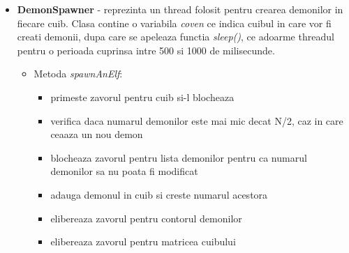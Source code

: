 \documentclass{article}
\begin{document}
\begin{itemize}
        \item \textbf{DemonSpawner} - reprezinta un thread folosit pentru crearea demonilor in fiecare cuib. Clasa contine o variabila \textit{coven} ce indica cuibul in care vor fi creati demonii, dupa care se apeleaza functia \textit{sleep()}, ce adoarme threadul pentru o perioada cuprinsa intre 500 si 1000 de milisecunde.
            \begin{itemize}
                   \item Metoda \textit{spawnAnElf}:
                    \begin{itemize}
                        \item primeste zavorul pentru cuib si-l blocheaza
                        \item verifica daca numarul demonilor este mai mic decat N/2, caz in care ceaaza un nou demon
                        \item blocheaza zavorul pentru lista demonilor pentru ca numarul demonilor sa nu poata fi modificat
                        \item adauga demonul in cuib si creste numarul acestora
                        \item elibereaza zavorul pentru contorul demonilor
                        \item elibereaza zavorul pentru matricea cuibului
                
                    \end{itemize}
            \end{itemize}
            

\end{itemize}
\end{document}
